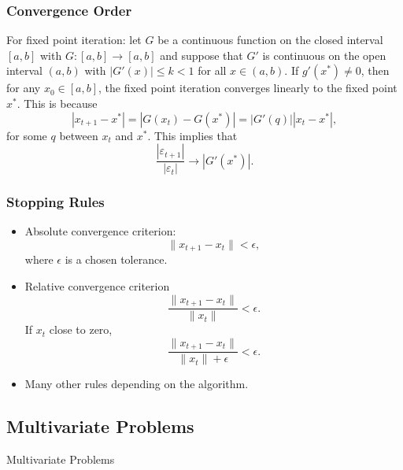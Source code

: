  \begin{frame}[t]
  \frametitle{Convergence Order}

\noindent For fixed point iteration: let $G$ be a continuous function on the closed interval $[a,b]$ with $G:[a,b]\rightarrow[a,b]$ and suppose that $G'$ is continuous on the open interval $(a,b)$ with $|G'(x)|\leq k < 1$ for all $x\in (a,b)$. If $g'(x^*)\neq 0$, then for any $x_0\in [a,b]$, the fixed point iteration converges linearly to the fixed point $x^*$. This is because\\
$$
|x_{t+1}-x^*| = |G(x_t)-G(x^*)| = |G'(q)||x_t-x^*|,
$$
for some $q$ between $x_t$ and $x^*$. This implies that
$$
\frac{|\varepsilon_{t+1}|}{|\varepsilon_{t}|} \rightarrow |G'(x^*)|.
$$

  \end{frame}



 \begin{frame}[t]
  \frametitle{Stopping Rules}
\begin{itemize}
\item Absolute convergence criterion:
$$
\|x_{t+1} - x_t\| < \epsilon,
$$
where $\epsilon$ is a chosen tolerance.

\item Relative convergence criterion
$$
\frac{\|x_{t+1}-x_{t}\|}{\|x_t\|}<\epsilon.
$$
If $x_t$ close to zero,
$$
\frac{\|x_{t+1}-x_{t}\|}{\|x_t\|+\epsilon}<\epsilon.
$$
\item Many other rules depending on the algorithm.
\end{itemize}
 \end{frame}


\subsection{Multivariate Problems}

\begin{frame}{}
\begin{block}{\center Multivariate Problems}
\end{block}
\end{frame}


